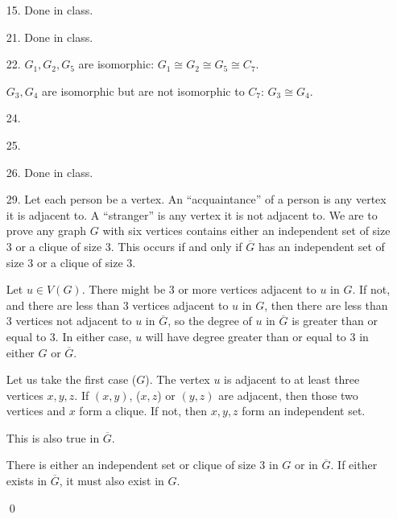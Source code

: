 \documentclass{article}
\begin{document}
\begin{enumerate}
\item[15.]
	Done in class.

\item[21.]
	Done in class.	

\item[22.]
	$G_1,G_2,G_5$ are isomorphic: $G_1\cong G_2\cong G_5\cong C_7$.	

	$G_3,G_4$ are isomorphic but are not isomorphic to $C_7$: $G_3\cong G_4$.

\item[24.]
	

\item[25.]
	

\item[26.]
	Done in class.

\item[29.]
	Let each person be a vertex. An ``acquaintance'' of a person is any vertex it is adjacent to. A ``stranger'' is any vertex it is not adjacent to. We are to prove any graph $G$ with six vertices contains either an independent set of size $3$ or a clique of size $3$. This occurs if and only if $\overline G$ has an independent set of size $3$ or a clique of size $3$.

	Let $u\in V(G)$. There might be $3$ or more vertices adjacent to $u$ in $G$. If not, and there are less than $3$ vertices adjacent to $u$ in $G$, then there are less than $3$ vertices not adjacent to $u$ in $\overline G$, so the degree of $u$ in $\overline G$ is greater than or equal to $3$. In either case, $u$ will have degree greater than or equal to $3$ in either $G$ or $\overline G$.

	Let us take the first case ($G$). The vertex $u$ is adjacent to at least three vertices $x,y,z$. If $(x,y)$, ($x,z$) or $(y,z)$ are adjacent, then those two vertices and $x$ form a clique. If not, then $x,y,z$ form an independent set.

	This is also true in $\overline G$.

	There is either an independent set or clique of size $3$ in $G$ or in $\overline G$. If either exists in $\overline G$, it must also exist in $G$.

	\qed
\end{enumerate}
\end{document}
